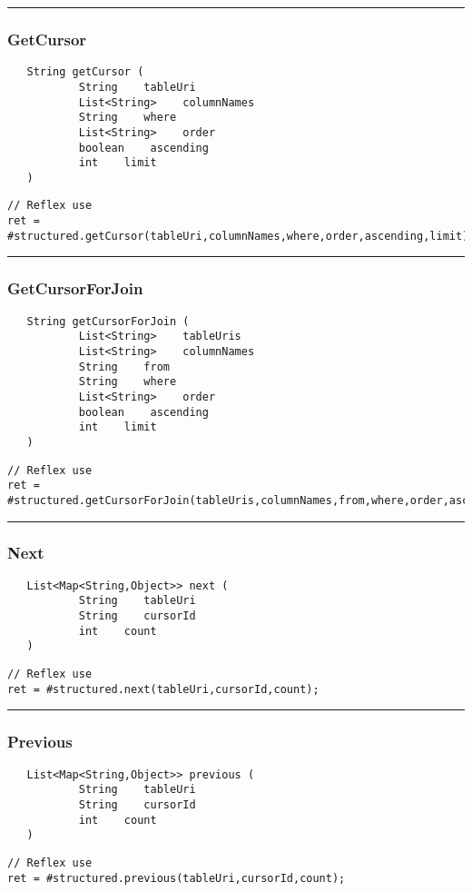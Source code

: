 \rule{15cm}{2pt}
\subsubsection{GetCursor}
\label{Api:GetCursor}
\begin{verbatim}
   String getCursor (
           String    tableUri
           List<String>    columnNames
           String    where
           List<String>    order
           boolean    ascending
           int    limit
   )
\end{verbatim}
\begin{lstlisting}[language=reflex]
// Reflex use
ret = #structured.getCursor(tableUri,columnNames,where,order,ascending,limit);
\end{lstlisting}



\rule{15cm}{2pt}
\subsubsection{GetCursorForJoin}
\label{Api:GetCursorForJoin}
\begin{verbatim}
   String getCursorForJoin (
           List<String>    tableUris
           List<String>    columnNames
           String    from
           String    where
           List<String>    order
           boolean    ascending
           int    limit
   )
\end{verbatim}
\begin{lstlisting}[language=reflex]
// Reflex use
ret = #structured.getCursorForJoin(tableUris,columnNames,from,where,order,ascending,limit);
\end{lstlisting}



\rule{15cm}{2pt}
\subsubsection{Next}
\label{Api:Next}
\begin{verbatim}
   List<Map<String,Object>> next (
           String    tableUri
           String    cursorId
           int    count
   )
\end{verbatim}
\begin{lstlisting}[language=reflex]
// Reflex use
ret = #structured.next(tableUri,cursorId,count);
\end{lstlisting}



\rule{15cm}{2pt}
\subsubsection{Previous}
\label{Api:Previous}
\begin{verbatim}
   List<Map<String,Object>> previous (
           String    tableUri
           String    cursorId
           int    count
   )
\end{verbatim}
\begin{lstlisting}[language=reflex]
// Reflex use
ret = #structured.previous(tableUri,cursorId,count);
\end{lstlisting}



